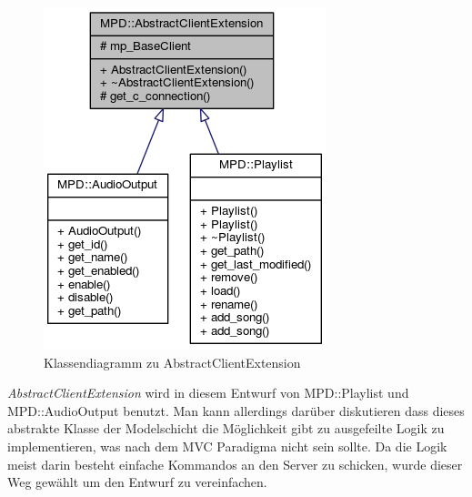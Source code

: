 \begin{figure}[htb!]
	\centering
        \includegraphics[scale=0.6]{AbstractClientExtension.png}
	\caption{Klassendiagramm zu AbstractClientExtension}
	\label{c_abstract_client_extension}
\end{figure}

\emph{AbstractClientExtension} wird in diesem Entwurf von MPD::Playlist und MPD::AudioOutput benutzt.
Man kann allerdings darüber diskutieren dass dieses abstrakte Klasse der Modelschicht die Möglichkeit gibt zu ausgefeilte Logik zu implementieren, was nach dem MVC Paradigma nicht sein sollte.  
Da die Logik meist darin besteht einfache Kommandos an den Server zu schicken, wurde dieser Weg gewählt um 
den Entwurf zu vereinfachen.


